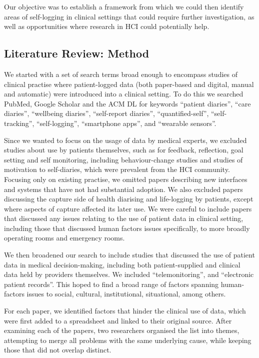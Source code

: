 \documentclass{sigchi}
\begin{document}
 Our objective  was to establish a framework from which we could then identify areas of self-logging in clinical settings that could require further investigation, as well as opportunities where research in HCI could potentially help.  

\subsection{Literature Review: Method}

We started with a set of search terms broad enough to encompass studies of clinical practise where patient-logged data (both paper-based and digital, manual and automatic) were introduced into a clinical setting.  To do this we searched PubMed, Google Scholar and the ACM DL for keywords ``patient diaries'', ``care diaries'', ``wellbeing diaries'', ``self-report diaries'', ``quantified-self'', ``self-tracking'', ``self-logging'', ``smartphone apps'', and ``wearable sensors''.

Since we wanted to focus on the usage of data by medical experts, we excluded studies about use by patients themselves, such as for feedback, reflection, goal setting and self monitoring, including behaviour-change studies and studies of motivation to self-diaries, which were prevalent from the HCI community.   Focusing only on existing practise, we omitted papers describing new interfaces and systems that have not had substantial adoption.  We also excluded papers discussing the capture side of health diarising and life-logging by patients, except where aspects of capture affected its later use.  We were careful to include papers that discussed any issues relating to the use of patient data in clinical setting, including those that discussed human factors issues specifically, to more broadly operating rooms and emergency rooms.

We then broadened our search to include studies that discussed the use of patient data in medical decision-making, including both patient-supplied and clinical data held by providers themselves.  We included ``telemonitoring'', and ``electronic patient records''.  This  hoped to find a broad range of factors spanning human-factors issues to social, cultural, institutional, situational, among others.

For each paper, we identified factors that hinder the clinical use of data, which were first added to a spreadsheet and linked to their original source.  After examining each of the papers, two researchers organised the list into themes, attempting to merge all problems with the same underlying cause, while keeping those that did not overlap distinct.  %
\end{document}
